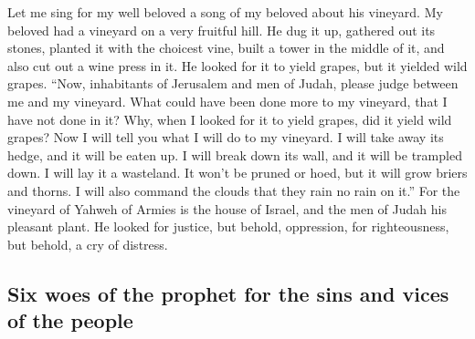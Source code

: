 \begin{paracol}{2}
\begin{otherlanguage}{english}
 Let me sing for my well beloved a song of my beloved
about his vineyard. My beloved had a vineyard on a very fruitful hill.
 He dug it up, gathered out its stones, planted it with
the choicest vine, built a tower in the middle of it, and also cut out a
wine press in it. He looked for it to yield grapes, but it yielded wild
grapes.  ``Now, inhabitants of Jerusalem and men of Judah,
please judge between me and my vineyard.  What could have
been done more to my vineyard, that I have not done in it? Why, when I
looked for it to yield grapes, did it yield wild grapes? 
Now I will tell you what I will do to my vineyard. I will take away its
hedge, and it will be eaten up. I will break down its wall, and it will
be trampled down.  I will lay it a wasteland. It won't be
pruned or hoed, but it will grow briers and thorns. I will also command
the clouds that they rain no rain on it.''  For the
vineyard of Yahweh of Armies is the house of Israel, and the men of
Judah his pleasant plant. He looked for justice, but behold, oppression,
for righteousness, but behold, a cry of distress.

\hypertarget{six-woes-of-the-prophet-for-the-sins-and-vices-of-the-people}{%
\subsection{Six woes of the prophet for the sins and vices of the
people}\label{six-woes-of-the-prophet-for-the-sins-and-vices-of-the-people}}


\end{otherlanguage}
\end{paracol}
